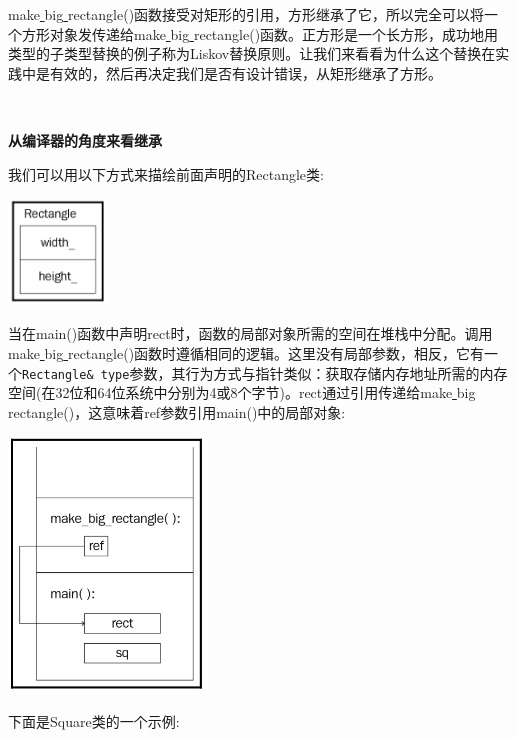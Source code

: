 make\underline{ }big\underline{ }rectangle()函数接受对矩形的引用，方形继承了它，所以完全可以将一个方形对象发传递给make\underline{ }big\underline{ }rectangle()函数。正方形是一个长方形，成功地用类型的子类型替换的例子称为Liskov替换原则。让我们来看看为什么这个替换在实践中是有效的，然后再决定我们是否有设计错误，从矩形继承了方形。 \par

\noindent\textbf{}\ \par
\textbf{从编译器的角度来看继承} \ \par
我们可以用以下方式来描绘前面声明的Rectangle类: \par

\begin{center}
	\includegraphics[width=0.2\textwidth]{content/Section-1/Chapter-3/13}
\end{center}

当在main()函数中声明rect时，函数的局部对象所需的空间在堆栈中分配。调用make\underline{ }big\underline{ }rectangle()函数时遵循相同的逻辑。这里没有局部参数，相反，它有一个\texttt{Rectangle\& type}参数，其行为方式与指针类似：获取存储内存地址所需的内存空间(在32位和64位系统中分别为4或8个字节)。rect通过引用传递给make\underline{ }big\underline{ }rectangle()，这意味着ref参数引用main()中的局部对象: \par

\begin{center}
	\includegraphics[width=0.4\textwidth]{content/Section-1/Chapter-3/14}
\end{center}

下面是Square类的一个示例: \par

